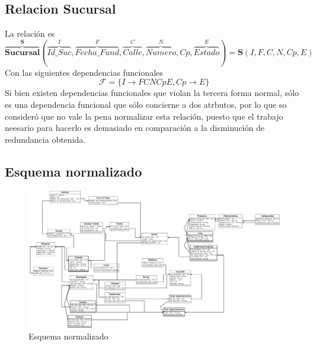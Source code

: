 \documentclass[10pt]{article}
\begin{document}
    \subsection{Relacion Sucursal}
    La relación es 
    \[\overbrace{{\textbf{Sucursal}}}^{\textbf{S}} 
    (
	   \overbrace{Id\_Suc}^{I}, \overbrace{Fecha\_Fund}^{F},
	   \overbrace{Calle}^{C}, \overbrace{Numero}^{N}, Cp,
	   \overbrace{Estado}^{E}
	)
	= 
	\textbf{S}(I, F, C, N, Cp, E)
	\]
    Con las siguientes dependencias funcionales
    \[\mathcal{F} = \{I \rightarrow FCNCpE, Cp \rightarrow E\}\]
    Si bien existen dependencias funcionales que violan la tercera forma normal,
    sólo es una dependencia funcional que sólo concierne a dos atrbutos, por lo
    que so consideró que no vale la pena normalizar esta relación, puesto que el
    trabajo neesario para hacerlo es demasiado en comparación a la disminución de
	redundancia obtenida.
	
	\subsection{Esquema normalizado}
	\begin{figure}[H]
		\centering
		\includegraphics[scale=0.2]{practica07Norm.jpeg}
		\caption{Esquema normalizado}
		\label{fg:en}
	\end{figure}
	
\end{document}

